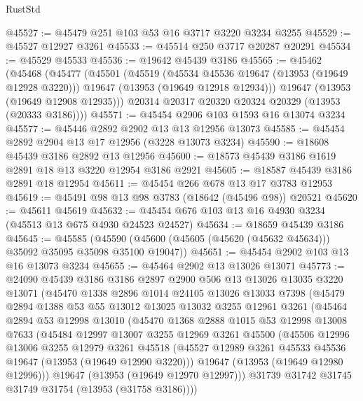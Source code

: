 \begin{lexlean}{RustStd}
\begin{coremodule}
@45527 := @45479 @251 @103 @53 @16 @3717 @3220 @3234 @3255
@45529 := @45527 @12927 @3261
@45533 := @45514 @250 @3717 @20287 @20291
@45534 := @45529 @45533
@45536 := @19642 @45439 @3186
@45565 := @45462
    (@45468
      (@45477
        (@45501
          (@45519
            (@45534 @45536 @19647 (@13953 (@19649 @12928 @3220)))
            @19647
            (@13953 (@19649 @12918 @12934)))
          @19647
          (@13953 (@19649 @12908 @12935)))
        @20314
        @20317
        @20320
        @20324
        @20329
        (@13953 (@20333 @3186))))
@45571 := @45454 @2906 @103 @1593 @16 @13074 @3234
@45577 := @45446 @2892 @2902 @13 @13 @12956 @13073
@45585 := @45454 @2892 @2904 @13 @17 @12956 (@3228 @13073 @3234)
@45590 := @18608 @45439 @3186 @2892 @13 @12956
@45600 := @18573 @45439 @3186 @1619 @2891 @18 @13 @3220 @12954 @3186 @2921
@45605 := @18587 @45439 @3186 @2891 @18 @12954
@45611 := @45454 @266 @678 @13 @17 @3783 @12953
@45619 := @45491 @98 @13 @98 @3783 (@18642 (@45496 @98)) @20521
@45620 := @45611 @45619
@45632 := @45454 @676 @103 @13 @16 @4930 @3234 (@45513 @13 @675 @4930 @24523 @24527)
@45634 := @18659 @45439 @3186
@45645 := @45585
    (@45590 (@45600 (@45605 (@45620 (@45632 @45634))) @35092 @35095 @35098 @35100 @19047))
@45651 := @45454 @2902 @103 @13 @16 @13073 @3234
@45655 := @45464 @2902 @13 @13026 @13071
@45773 := @24090
    @45439
    @3186
    @3186
    @2897
    @2900
    @506
    @13
    @13026
    @13035
    @3220
    @13071
    (@45470
      @1338
      @2896
      @1014
      @24105
      @13026
      @13033
      @7398
      (@45479
        @2894
        @1388
        @53
        @55
        @13012
        @13025
        @13032
        @3255
        @12961
        @3261
        (@45464
          @2894
          @53
          @12998
          @13010
          (@45470
            @1368
            @2888
            @1015
            @53
            @12998
            @13008
            @7633
            (@45484
              @12997
              @13007
              @3255
              @12969
              @3261
              @45500
              (@45506
                @12996
                @13006
                @3255
                @12979
                @3261
                @45518
                (@45527 @12989 @3261 @45533 @45536 @19647 (@13953 (@19649 @12990 @3220)))
                @19647
                (@13953 (@19649 @12980 @12996)))
              @19647
              (@13953 (@19649 @12970 @12997)))
            @31739
            @31742
            @31745
            @31749
            @31754
            (@13953 (@31758 @3186))))

\end{coremodule}
\end{lexlean}
